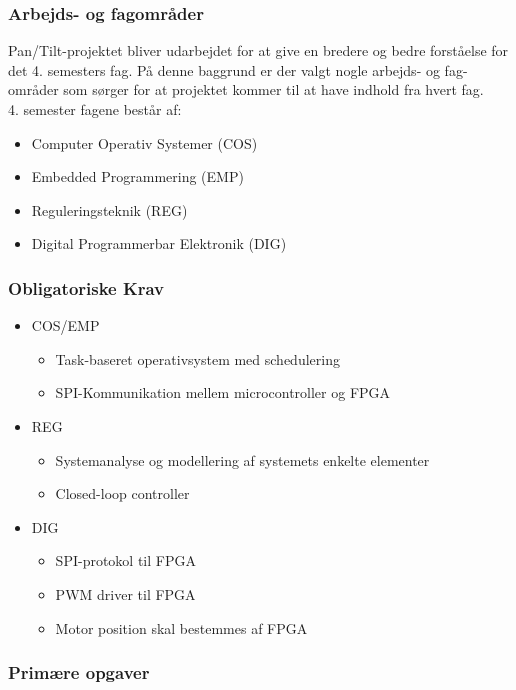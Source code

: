 \subsubsection{Arbejds- og fagområder}
Pan/Tilt-projektet bliver udarbejdet for at give en bredere og bedre forståelse for det 4. semesters fag. På denne baggrund er der valgt nogle arbejds- og fag-områder som sørger for at projektet kommer til at have indhold fra hvert fag.\\
4. semester fagene består af:
\begin{itemize}[noitemsep]
	\item Computer Operativ Systemer (COS)
	\item Embedded Programmering (EMP)
	\item Reguleringsteknik (REG)
	\item Digital Programmerbar Elektronik (DIG)
\end{itemize}

\subsubsection{Obligatoriske Krav}

\begin{itemize}[noitemsep]
	\item COS/EMP
	\begin{itemize}[noitemsep]
		\item Task-baseret operativsystem med schedulering
		\item SPI-Kommunikation mellem microcontroller og FPGA
	\end{itemize}
	\item REG
	\begin{itemize}[noitemsep]
		\item Systemanalyse og modellering af systemets enkelte elementer
		\item Closed-loop controller
	\end{itemize}
	\item DIG
	\begin{itemize}[noitemsep]
		\item SPI-protokol til FPGA
		\item PWM driver til FPGA
		\item Motor position skal bestemmes af FPGA
	\end{itemize}
\end{itemize}

\subsubsection{Primære opgaver}

